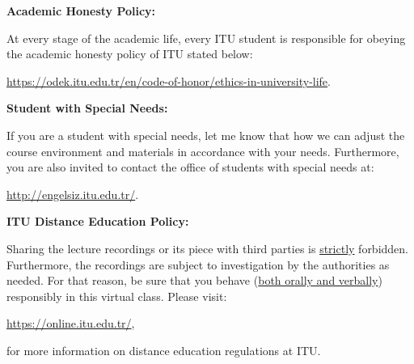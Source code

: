 \documentclass[
  12pt,
]{article}
\begin{document}
\textbf{Academic Honesty Policy:}

At every stage of the academic life, every ITU student is responsible
for obeying the academic honesty policy of ITU stated below:

\url{https://odek.itu.edu.tr/en/code-of-honor/ethics-in-university-life}.

\textbf{Student with Special Needs:}

If you are a student with special needs, let me know that how we can
adjust the course environment and materials in accordance with your
needs. Furthermore, you are also invited to contact the office of
students with special needs at:

\url{http://engelsiz.itu.edu.tr/}.

\textbf{ITU Distance Education Policy:}

Sharing the lecture recordings or its piece with third parties is
\underline{strictly} forbidden. Furthermore, the recordings are subject
to investigation by the authorities as needed. For that reason, be sure
that you behave (\underline{both orally and verbally}) responsibly in
this virtual class. Please visit:

\url{https://online.itu.edu.tr/},

for more information on distance education regulations at ITU.
\end{document}
